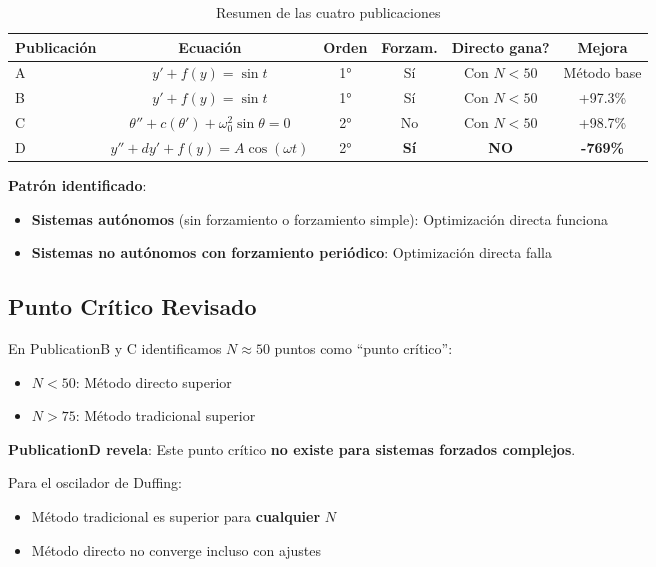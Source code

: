 \documentclass[11pt,a4paper]{article}
\begin{document}
\begin{table}[H]
\centering
\caption{Resumen de las cuatro publicaciones}
\small
\begin{tabular}{lccccc}
\toprule
\textbf{Publicación} & \textbf{Ecuación} & \textbf{Orden} & \textbf{Forzam.} & \textbf{Directo gana?} & \textbf{Mejora} \\
\midrule
A & $y' + f(y) = \sin t$ & 1° & Sí & Con $N < 50$ & Método base \\
B & $y' + f(y) = \sin t$ & 1° & Sí & Con $N < 50$ & +97.3\% \\
C & $\theta'' + c(\theta') + \omega_0^2 \sin\theta = 0$ & 2° & No & Con $N < 50$ & +98.7\% \\
\rowcolor{red!20}
D & $y'' + d y' + f(y) = A \cos(\omega t)$ & 2° & \textbf{Sí} & \textbf{NO} & \textbf{-769\%} \\
\bottomrule
\end{tabular}
\end{table}

\textbf{Patrón identificado}:

\begin{itemize}
\item \textbf{Sistemas autónomos} (sin forzamiento o forzamiento simple): Optimización directa funciona
\item \textbf{Sistemas no autónomos con forzamiento periódico}: Optimización directa falla
\end{itemize}

\subsection{Punto Crítico Revisado}

En PublicationB y C identificamos $N \approx 50$ puntos como ``punto crítico'':
\begin{itemize}
\item $N < 50$: Método directo superior
\item $N > 75$: Método tradicional superior
\end{itemize}

\textbf{PublicationD revela}: Este punto crítico \textbf{no existe para sistemas forzados complejos}.

Para el oscilador de Duffing:
\begin{itemize}
\item Método tradicional es superior para \textbf{cualquier} $N$
\item Método directo no converge incluso con ajustes
\end{itemize}
\end{document}
